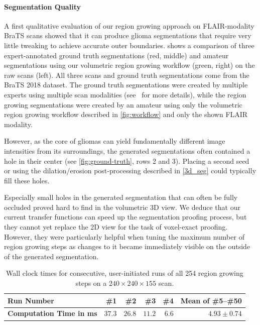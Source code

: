 \documentclass[sigconf]{acmart}
\begin{document}
\paragraph{Segmentation Quality}
A first qualitative evaluation of our region growing approach on FLAIR-modality BraTS scans showed that it can produce glioma segmentations that require very little tweaking to achieve accurate outer boundaries.
 shows a comparison of three expert-annotated ground truth segmentations (red, middle) and amateur segmentations using our volumetric region growing workflow (green, right) on the raw scans (left). All three scans and ground truth segmentations come from the BraTS 2018 dataset.
The ground truth segmentations were created by multiple experts using multiple scan modalities (see~\cite{brats2} for more details), while the region growing segmentations were created by an amateur using only the volumetric region growing workflow described in \cref{fig:workflow} and only the shown FLAIR modality.

However, as the core of gliomas can yield fundamentally different image intensities from its surroundings, the generated segmentations often contained a hole in their center (see \cref{fig:ground-truth}, rows 2 and 3).
Placing a second seed or using the dilation/erosion post-processing described in \cref{3d_seg} could typically fill these holes.

Especially small holes in the generated segmentation that can often be fully occluded proved hard to find in the volumetric 3D view. We deduce that our current transfer functions can speed up the segmentation proofing process, but they cannot yet replace the 2D view for the task of voxel-exact proofing. However, they were particularly helpful when tuning the maximum number of region growing steps as changes to it became immediately visible on the outside of the generated segmentation.

\begin{table}[t]
    \centering
    \small
    \renewcommand{\arraystretch}{1.2}
    \begin{tabularx}{\linewidth}{X|rrrrr}
        \footnotesize\textbf{Run Number} %
            & \#1 & \#2 & \#3 & \#4 & Mean of \#5--\#50 \\%
        \midrule %
        \footnotesize\textbf{Computation Time in \si{\ms}} %
            & $37.3$ & $26.8$ & $11.2$ & $6.6$ & $4.93\pm0.74$ \\
    \end{tabularx}
    \vspace*{2mm}
    \caption{Wall clock times for consecutive, user-initiated runs of all 254 region growing steps on a $240\times240\times155$ scan.}%
    \label{tab:computationtimes}
\end{table}
\end{document}
